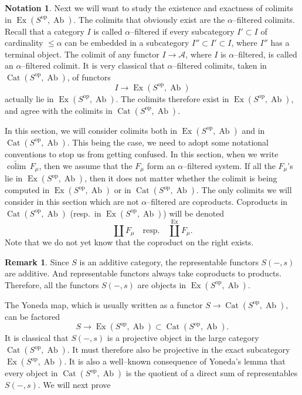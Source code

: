 \documentclass[11pt,a4paper]{article}
\theoremstyle{plain}
\theoremstyle{definition}
\newtheorem{remark}[theorem]{Remark}
\newtheorem{notation}[theorem]{Notation}
\DeclareMathOperator{\colim}{colim}
\DeclareMathOperator{\Cat}{Cat}
\DeclareMathOperator{\Ex}{Ex}
\DeclareMathOperator{\Ab}{Ab}
\newcommand{\op}{\mathrm{op}}
\numberwithin{equation}{section}
\begin{document}
\begin{notation}\label{not2.2}
Next we will want to study the existence and exactness of colimits in $\Ex(S^{\op},\Ab)$. The colimits that obviously exist are the $\alpha$--filtered colimits. Recall that a category $I$ is called $\alpha$--filtered if every subcategory $I' \subset I$ of cardinality $\leq\alpha$ can be embedded in a subcategory $I'' \subset I' \subset I$, where $I''$ has a terminal object. The colimit of any functor $I \to \mathcal{A}$, where $I$ is $\alpha$--filtered, is called an $\alpha$--filtered colimit. It is very classical that $\alpha$--filtered colimits, taken in $\Cat(S^{\op},\Ab)$, of functors
\begin{equation*}
I \longrightarrow \Ex(S^{\op},\Ab)
\end{equation*}
actually lie in $\Ex(S^{\op},\Ab)$. The colimits therefore exist in $\Ex(S^{\op},\Ab)$, and agree with the colimits in $\Cat(S^{\op},\Ab)$.

In this section, we will consider colimits both in $\Ex(S^{\op},\Ab)$ and in $\Cat(S^{\op},\Ab)$. This being the case, we need to adopt some notational conventions to stop us from getting confused. In this section, when we write $\underrightarrow{\colim}\,F_{\mu}$, then we assume that the $F_{\mu}$ form an $\alpha$--filtered system. If all the $F_{\mu}$'s lie in $\Ex(S^{\op},\Ab)$, then it does not matter whether the colimit is being computed in $\Ex(S^{\op},\Ab)$ or in $\Cat(S^{\op},\Ab)$. The only colimits we will consider in this section which are not $\alpha$--filtered are coproducts. Coproducts in $\Cat(S^{\op},\Ab)$ (resp.\ in $\Ex(S^{\op},\Ab)$) will be denoted
\begin{equation*}
\coprod F_{\mu} \quad \text{resp.}\quad \coprod^{\!\!\!\Ex} F_{\mu}.
\end{equation*}
Note that we do not yet know that the coproduct on the right exists.
\end{notation}

\begin{remark}\label{rem2.3}
Since $S$ is an additive category, the representable functors $S(-,s)$ are additive. And representable functors always take coproducts to products. Therefore, all the functors $S(-,s)$ are objects in $\Ex(S^{\op},\Ab)$.

The Yoneda map, which is usually written as a functor $S \to \Cat(S^{\op},\Ab)$, can be factored
\begin{equation*}
S \longrightarrow \Ex(S^{\op},\Ab) \subset \Cat(S^{\op},\Ab).
\end{equation*}
It is classical that $S(-,s)$ is a projective object in the large category $\Cat(S^{\op},\Ab)$. It must therefore also be projective in the exact subcategory $\Ex(S^{\op},\Ab)$. It is also a well--known consequence of Yoneda's lemma that every object in $\Cat(S^{\op},\Ab)$ is the quotient of a direct sum of representables $S(-,s)$. We will next prove
\end{remark}
\end{document}
